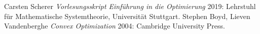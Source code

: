 \documentclass[letterpaper, 10 pt, conference]{ieeeconf}  %
\begin{document}

%
%

\begin{thebibliography}{99}
	   Carsten Scherer {\em Vorlesungsskript Einführung in die Optimierung} 2019: Lehrstuhl für Mathematische Systemtheorie, Universität Stuttgart.
	   Stephen Boyd, Lieven Vandenberghe {\em Convex Optimization} 2004: Cambridge University Press.
\end{thebibliography}
\end{document}
